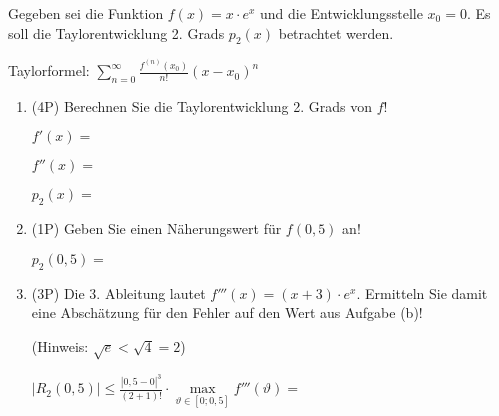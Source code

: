 Gegeben sei die Funktion $f(x) = x\cdot e^x$ und die Entwicklungsstelle $x_0=0$. Es soll die Taylorentwicklung 2. Grads $p_2(x)$ betrachtet werden.

Taylorformel: $\sum\limits_{n=0}^\infty\frac{f^{(n)}(x_0)}{n!}(x-x_0)^n$

\begin{enumerate}[label=(\alph*)]

\item (4P) Berechnen Sie die Taylorentwicklung 2. Grads von $f$!

\bigskip

$f'(x) = $

\bigskip

$f''(x) = $

\bigskip

$p_2(x) = $

\bigskip
\bigskip
\bigskip
\bigskip
\bigskip

\item (1P) Geben Sie einen Näherungswert für $f(0{,}5)$ an!

\bigskip

$p_2(0{,}5) = $

\bigskip
\bigskip

\item (3P) Die 3. Ableitung lautet $f'''(x)=(x+3)\cdot e^x$. Ermitteln Sie damit eine Abschätzung für den Fehler auf den Wert aus Aufgabe (b)! 

(Hinweis: $\sqrt{e} < \sqrt{4} = 2$)

\bigskip

$|R_2(0{,}5)| \le \frac{|0{,}5-0|^3}{(2+1)!}\cdot\max\limits_{\vartheta\in[0;0{,}5]} f'''(\vartheta) =$

\end{enumerate}
